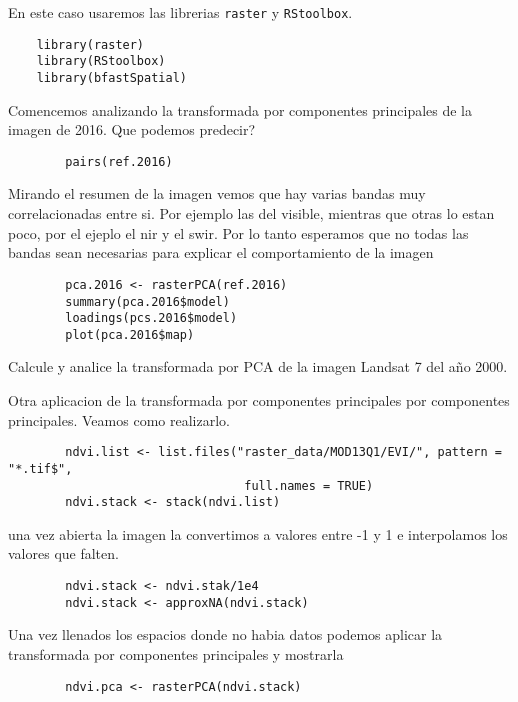 \documentclass[a4paper]{article}
\begin{document}
En este caso usaremos las librerias \texttt{raster} y \texttt{RStoolbox}.

\begin{lstlisting}
    library(raster)
    library(RStoolbox)
    library(bfastSpatial)
\end{lstlisting}


\begin{exa}
    Comencemos analizando la transformada por componentes principales de la
    imagen de 2016. Que podemos predecir?
    \begin{lstlisting}
        pairs(ref.2016)
    \end{lstlisting}

    Mirando el resumen de la imagen vemos que hay varias bandas muy
    correlacionadas entre si. Por ejemplo las del visible, mientras que otras lo
    estan poco, por el ejeplo el nir y el swir. Por lo tanto esperamos que no
    todas las bandas sean necesarias para explicar el comportamiento de la
    imagen


    \begin{lstlisting}
        pca.2016 <- rasterPCA(ref.2016)
        summary(pca.2016$model)
        loadings(pcs.2016$model)
        plot(pca.2016$map)
    \end{lstlisting}

\end{exa}

\begin{act}
    Calcule y analice la transformada por PCA de la imagen Landsat 7 del año
    2000.
\end{act}

\begin{exa}
    Otra aplicacion de la transformada por componentes principales por
    componentes principales. Veamos como realizarlo.
    \begin{lstlisting}
        ndvi.list <- list.files("raster_data/MOD13Q1/EVI/", pattern = "*.tif$",
                                 full.names = TRUE)
        ndvi.stack <- stack(ndvi.list)
    \end{lstlisting}
    una vez abierta la imagen la convertimos a valores entre -1 y 1 e
    interpolamos los valores que falten.
    \begin{lstlisting}
        ndvi.stack <- ndvi.stak/1e4
        ndvi.stack <- approxNA(ndvi.stack)
    \end{lstlisting}
    Una vez llenados los espacios donde no habia datos podemos aplicar la
    transformada por componentes principales y mostrarla
    \begin{lstlisting}
        ndvi.pca <- rasterPCA(ndvi.stack)
    \end{lstlisting}
\end{exa}
\end{document}
